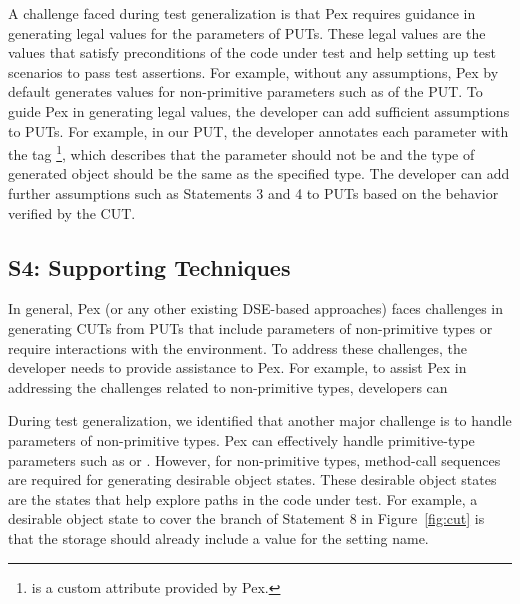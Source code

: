 A challenge faced during test generalization is that Pex requires guidance in generating legal values for the parameters of PUTs. These legal values are the values that satisfy preconditions of the code under test and help setting up test scenarios to pass test assertions. For example, without any assumptions, Pex by default generates  values for non-primitive parameters such as  of the PUT. To guide Pex in generating legal values, the developer can add sufficient assumptions to PUTs. For example, in our PUT, the developer annotates each parameter with the tag \footnote{ is a custom attribute provided by Pex.}, which describes that the parameter should not be  and the type of generated object should be the same as the specified type. The developer can add further assumptions such as Statements 3 and 4 to PUTs based on the behavior verified by the CUT.

\subsection{S4: Supporting Techniques}

In general, Pex (or any other existing DSE-based approaches) faces challenges in generating CUTs from PUTs that include parameters of non-primitive types or require interactions with the environment. To address these challenges, the developer 
needs to provide assistance to Pex. For example, to assist Pex in addressing the challenges related to non-primitive types, developers can 

During test generalization, we identified that another major challenge is to handle parameters of non-primitive types. Pex can effectively handle primitive-type parameters such as  or . However, for non-primitive types, method-call sequences are required for generating desirable object states. These desirable object states are the states that help explore paths in the code under test. For example, a desirable object state to cover the  branch of Statement 8 in Figure~\ref{fig:cut} is that the storage should already include a value for the setting name. 

